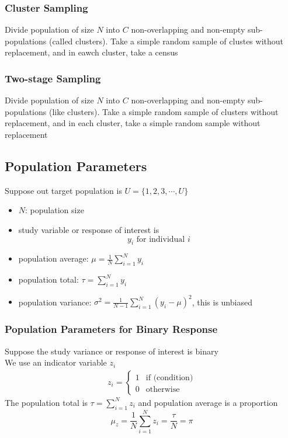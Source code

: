 \documentclass[11pt]{article}
\newcommand{\ds}{\displaystyle}
\begin{document}
\subsubsection{Cluster Sampling}
Divide population of size $N$ into $C$ non-overlapping and non-empty sub-populations (called clusters).
Take a simple random sample of clustes without replacement, and in eawch cluster, take a census 
\subsubsection{Two-stage Sampling}
Divide population of size $N$ into $C$ non-overlapping and non-empty sub-populations (like clusters).
Take a simple random sample of clusters without replacement, and in each cluster, take a simple random sample without replacement 
\subsection{Population Parameters}
Suppose out target population is $U=\{1,2,3,\cdots,U\}$
\begin{itemize}
    \item $N$: population size 
    \item study variable or response of interest is \[y_i\text{ for individual }i\]
    \item population average: $\mu=\ds\frac{1}{N}\sum_{i=1}^{N}y_i$
    \item population total: $\tau=\ds\sum_{i=1}^{N}y_i$
    \item population variance: $\sigma^2=\ds\frac{1}{N-1}\sum_{i=1}^{N}(y_i-\mu)^2$, this is unbiased
\end{itemize}
\subsubsection*{Population Parameters for Binary Response}
Suppose the study variance or response of interest is binary \\
We use an indicator variable $z_i$
\begin{align*}
    z_i = 
    \begin{cases}
        1 &\text{if (condition)} \\
        0 &\text{otherwise}
    \end{cases}
\end{align*}
The population total is $\tau=\ds\sum_{i=1}^{N}z_i$ and population average is a proportion 
\[\mu_z = \frac{1}{N}\sum_{i=1}^{N}z_i=\frac{\tau}{N}=\pi\]
\end{document}

